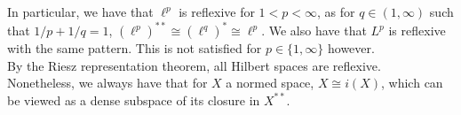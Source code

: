 \documentclass{tikzposter} %
\begin{document}
\begin{columns}
{      In particular, we have that $\ell^{p}$ is reflexive for $1 < p < \infty$, as for $q \in (1,\infty)$ such that $1/p+1/q = 1$, $(\ell^{p})^{**} \cong (\ell^{q})^{*} \cong \ell^{p}$. We also have that $L^{p}$ is reflexive with the same pattern. This is not satisfied for $p \in \{1,\infty\}$ however. \\

      By the Riesz representation theorem, all Hilbert spaces are reflexive. \\

      Nonetheless, we always have that for $X$ a normed space, $X \cong i(X)$, which can be viewed as a dense subspace of its closure in $X^{**}$.
  }

\end{columns}
\end{document}

